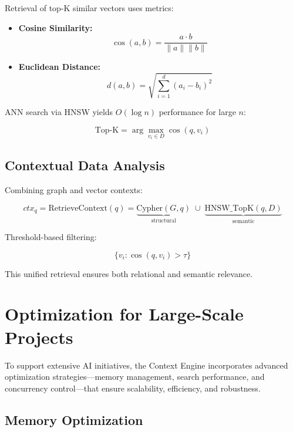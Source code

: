\documentclass[11pt]{article}
\begin{document}
Retrieval of top-K similar vectors uses metrics:

\begin{itemize}
  \item \textbf{Cosine Similarity:}
    \[
    \cos(a,b) = \frac{a \cdot b}{\|a\|\|b\|}
    \]
  \item \textbf{Euclidean Distance:}
    \[
    d(a,b) = \sqrt{\sum_{i=1}^d (a_i - b_i)^2}
    \]
\end{itemize}

ANN search via HNSW yields \(O(\log n)\) performance for large \(n\):

\[
\text{Top-K} = \arg\max_{v_i\in D}\cos(q,v_i)
\]

\subsection{Contextual Data Analysis}
\label{subsec:context_analysis}

Combining graph and vector contexts:

\[
ctx_q = \text{RetrieveContext}(q) = \underbrace{\text{Cypher}(G,q)}_{\text{structural}} \;\cup\; \underbrace{\text{HNSW\_TopK}(q,D)}_{\text{semantic}}
\]

Threshold-based filtering:

\[
\{v_i : \cos(q,v_i) > \tau\}
\]

This unified retrieval ensures both relational and semantic relevance.

\section{Optimization for Large-Scale Projects}
\label{sec:optimization}

To support extensive AI initiatives, the Context Engine incorporates advanced optimization strategies—memory management, search performance, and concurrency control—that ensure scalability, efficiency, and robustness.

\subsection{Memory Optimization}
\label{subsec:memory_optimization}
\end{document}
